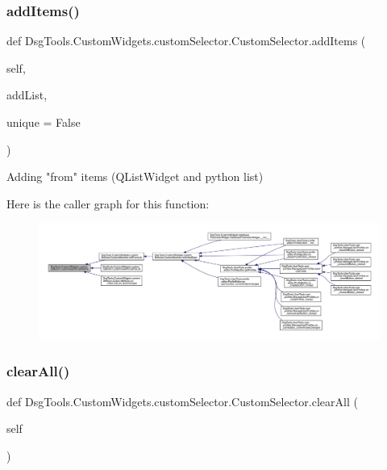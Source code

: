 \subsubsection{\texorpdfstring{add\+Items()}{addItems()}}
{\footnotesize\ttfamily def Dsg\+Tools.\+Custom\+Widgets.\+custom\+Selector.\+Custom\+Selector.\+add\+Items (\begin{DoxyParamCaption}\item[{}]{self,  }\item[{}]{add\+List,  }\item[{}]{unique = {\ttfamily False} }\end{DoxyParamCaption})}

\begin{DoxyVerb}Adding "from" items (QListWidget and python list)
\end{DoxyVerb}
 Here is the caller graph for this function\+:
\nopagebreak
\begin{figure}[H]
\begin{center}
\leavevmode
\includegraphics[width=350pt]{class_dsg_tools_1_1_custom_widgets_1_1custom_selector_1_1_custom_selector_a31840937788f429b5316cf302c0f0b0d_icgraph}
\end{center}
\end{figure}
\mbox{\label{class_dsg_tools_1_1_custom_widgets_1_1custom_selector_1_1_custom_selector_a7a295acad141e876019904a825e07578}} 
\subsubsection{\texorpdfstring{clear\+All()}{clearAll()}}
{\footnotesize\ttfamily def Dsg\+Tools.\+Custom\+Widgets.\+custom\+Selector.\+Custom\+Selector.\+clear\+All (\begin{DoxyParamCaption}\item[{}]{self }\end{DoxyParamCaption})}

